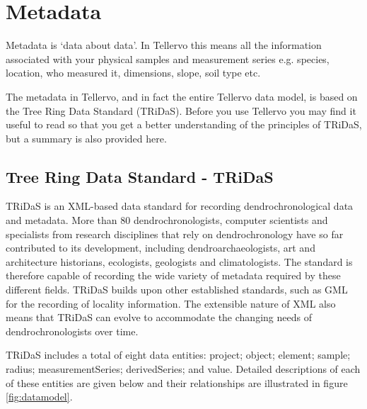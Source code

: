 \chapter{Metadata}
\label{txt:metadata}
Metadata is `data about data'. In Tellervo this means all the information associated with your physical samples and measurement series e.g. species, location, who measured it, dimensions, slope, soil type etc.

The metadata in Tellervo, and in fact the entire Tellervo data model, is based on the Tree Ring Data Standard (TRiDaS). Before you use Tellervo you may find it useful to read \citet{tridas} so that you get a better understanding of the principles of TRiDaS, but a summary is also provided here.

\section{Tree Ring Data Standard - TRiDaS}
TRiDaS is an XML-based data standard for recording dendrochronological data and metadata. More than 80 dendrochronologists, computer scientists and specialists from research disciplines that rely on dendrochronology have so far contributed to its development, including dendroarchaeologists, art and architecture historians, ecologists, geologists and climatologists.  The standard is therefore capable of recording the wide variety of metadata required by these different fields. TRiDaS builds upon other established standards, such as GML for the recording of locality information.  The extensible nature of XML also means that TRiDaS can evolve to accommodate the changing needs of dendrochronologists over time.  

TRiDaS includes a total of eight data entities: project; object; element; sample; radius; measurementSeries; derivedSeries; and value.  Detailed descriptions of each of these entities are given below and their relationships are illustrated in figure \ref{fig:datamodel}.

